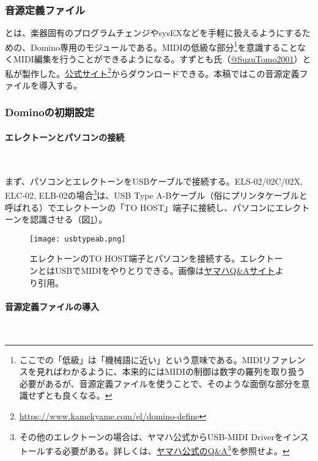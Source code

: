 \documentclass[uplatex, 10pt, dvipdfmx]{jsarticle}
\numberwithin{equation}{section}
\newcommand{\emphj}[1]{\textbf{\textrm{\textgt{{#1}}}}}
\begin{document}
\subsubsection{音源定義ファイル}

\emphj{音源定義ファイル}とは、楽器固有のプログラムチェンジやsysEXなどを手軽に扱えるようにするための、Domino専用のモジュールである。MIDIの低級な部分\footnote{ここでの「低級」は「機械語に近い」という意味である。MIDIリファレンス\cite{MIDIリファレンス}を見ればわかるように、本来的にはMIDIの制御は数字の羅列を取り扱う必要があるが、音源定義ファイルを使うことで、そのような面倒な部分を意識せずとも良くなる。}を意識することなくMIDI編集を行うことができるようになる。すずとも氏（\href{https://twitter.com/SuzuTomo2001}{@SuzuTomo2001}）と私が製作した。\href{https://www.kamekyame.com/el/domino-define}{公式サイト}\footnote{\url{https://www.kamekyame.com/el/domino-define}}からダウンロードできる。本稿ではこの音源定義ファイルを導入する。

\subsubsection{Dominoの初期設定}
\paragraph{エレクトーンとパソコンの接続}\

まず、パソコンとエレクトーンをUSBケーブルで接続する。ELS-02/02C/02X, ELC-02, ELB-02の場合\footnote{その他のエレクトーンの場合は、ヤマハ公式からUSB-MIDI Driverをインストールする必要がある。詳しくは、\href{https://yamaha.custhelp.com/app/answers/detail/a_id/10045/}{ヤマハ公式のQ\&A}\footnote{\url{https://yamaha.custhelp.com/app/answers/detail/a_id/10045/}}を参照せよ。}は、USB Type A-Bケーブル（俗にプリンタケーブルと呼ばれる）でエレクトーンの「TO HOST」端子に接続し、パソコンにエレクトーンを認識させる（図\ref{figELUSB}）。

\begin{figure}[h]
  \centering
  \texttt{[image: usbtypeab.png]}
  \caption{エレクトーンのTO HOST端子とパソコンを接続する。エレクトーンとはUSBでMIDIをやりとりできる。画像は\href{https://yamaha.custhelp.com/app/answers/detail/a_id/1316/related/1}{ヤマハQ\&Aサイト}より引用。}
  \label{figELUSB}
\end{figure}

\paragraph{音源定義ファイルの導入}\
\end{document}
